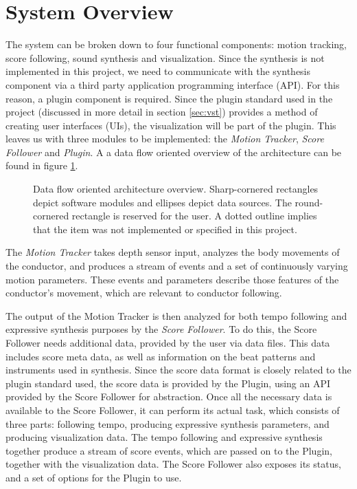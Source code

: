 \section{System Overview}

The system can be broken down to four functional components:
motion tracking, score following, sound synthesis
and visualization.
Since the synthesis is not implemented in this project,
we need to communicate with the synthesis component
via a third party application programming interface (API).
For this reason, a plugin component is required.
Since the plugin standard used in the project
(discussed in more detail in section \ref{sec:vst})
provides a method of creating user interfaces (UIs),
the visualization will be part of the plugin.
This leaves us with three modules
to be implemented:
the \textit{Motion Tracker}, \textit{Score Follower} and \textit{Plugin}.
A a data flow oriented overview of the architecture
can be found in figure \ref{fig:architecture}.

\begin{figure}
\begin{center}

\caption{
Data flow oriented architecture overview.
Sharp-cornered rectangles depict software modules and
ellipses depict data sources.
The round-cornered rectangle is reserved for the user.
A dotted outline implies that the item was not
implemented or specified in this project.
}
\label{fig:architecture}
\end{center}
\end{figure}

The \textit{Motion Tracker}
takes depth sensor input,
analyzes the body movements of the conductor,
and produces a stream of events and
a set of continuously varying motion parameters.
These events and parameters describe
those features of the conductor's movement,
which are relevant to conductor following.

The output of the Motion Tracker is then analyzed
for both tempo following and expressive synthesis purposes
by the \textit{Score Follower}.
To do this, the Score Follower needs additional
data, provided by the user via data files.
This data includes
score meta data, as well as
information on the beat patterns and instruments used in synthesis.
Since the score data format is closely related to the
plugin standard used,
the score data is provided by the Plugin,
using an API provided by the Score Follower for abstraction.
Once all the necessary data is available to the Score Follower,
it can perform its actual task,
which consists of three parts:
following tempo,
producing expressive synthesis parameters, and
producing visualization data.
The tempo following and expressive synthesis together
produce a stream of score events,
which are passed on to the Plugin,
together with the visualization data.
The Score Follower also exposes its status,
and a set of options for the Plugin to use.

